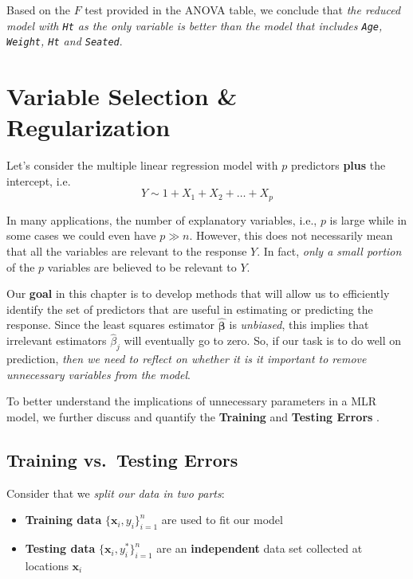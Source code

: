 \documentclass[
]{book}
\begin{document}
Based on the \(F\) test provided in the ANOVA table, we conclude that \emph{the reduced model with \texttt{Ht} as the only variable is better than the model that includes \texttt{Age}, \texttt{Weight}, \texttt{Ht} and \texttt{Seated}}.

\chapter{Variable Selection \& Regularization}\label{variable-selection-regularization}

Let's consider the multiple linear regression model with \(p\) predictors \textbf{plus} the intercept, i.e.
\[Y \sim 1+ X_1+X_2+ \ldots+X_p\]

In many applications, the number of explanatory variables, i.e., \(p\) is large while in some cases we could even have \(p\gg n\). However, this does not necessarily mean that all the variables are relevant to the response \(Y\). In fact, \emph{only a small portion} of the \(p\) variables are believed to be relevant to \(Y\).

Our \textbf{goal} in this chapter is to develop methods that will allow us to efficiently identify the set of predictors that are useful in estimating or predicting the response. Since the least squares estimator \(\hat{\mathbf{\beta}}\) is \emph{unbiased}, this implies that irrelevant estimators \(\hat{\beta}_j\) will eventually go to zero. So, if our task is to do well on prediction, \emph{then we need to reflect on whether it is it important to remove unnecessary variables from the model}.

To better understand the implications of unnecessary parameters in a MLR model, we further discuss and quantify the \textbf{Training} and \textbf{Testing Errors} .

\section{Training vs.~Testing Errors}\label{training-vs.-testing-errors}

Consider that we \emph{split our data in two parts}:

\begin{itemize}
\item
  \textbf{Training data} \(\{\mathbf{x}_i, y_i \}_{i=1}^n\) are used to fit our model
\item
  \textbf{Testing data} \(\{\mathbf{x}_i, y_i^* \}_{i=1}^n\) are an \textbf{independent} data set collected at locations \(\mathbf{x}_i\)
\end{itemize}
\end{document}
